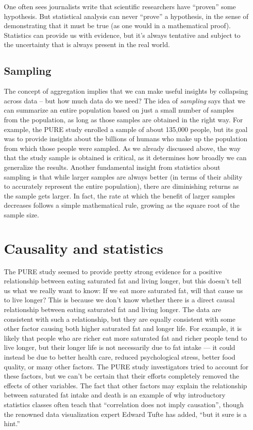 \documentclass[]{book}
\theoremstyle{definition}
\theoremstyle{definition}
\theoremstyle{definition}
\theoremstyle{remark}
\begin{document}
One often sees journalists write that scientific researchers have
``proven'' some hypothesis. But statistical analysis can never ``prove''
a hypothesis, in the sense of demonstrating that it must be true (as one
would in a mathematical proof). Statistics can provide us with evidence,
but it's always tentative and subject to the uncertainty that is always
present in the real world.

\subsection{Sampling}\label{sampling}

The concept of aggregation implies that we can make useful insights by
collapsing across data -- but how much data do we need? The idea of
\emph{sampling} says that we can summarize an entire population based on
just a small number of samples from the population, as long as those
samples are obtained in the right way. For example, the PURE study
enrolled a sample of about 135,000 people, but its goal was to provide
insights about the billions of humans who make up the population from
which those people were sampled. As we already discussed above, the way
that the study sample is obtained is critical, as it determines how
broadly we can generalize the results. Another fundamental insight from
statistics about sampling is that while larger samples are always better
(in terms of their ability to accurately represent the entire
population), there are diminishing returns as the sample gets larger. In
fact, the rate at which the benefit of larger samples decreases follows
a simple mathematical rule, growing as the square root of the sample
size.

\section{Causality and statistics}\label{causality-and-statistics}

The PURE study seemed to provide pretty strong evidence for a positive
relationship between eating saturated fat and living longer, but this
doesn't tell us what we really want to know: If we eat more saturated
fat, will that cause us to live longer? This is because we don't know
whether there is a direct causal relationship between eating saturated
fat and living longer. The data are consistent with such a relationship,
but they are equally consistent with some other factor causing both
higher saturated fat and longer life. For example, it is likely that
people who are richer eat more saturated fat and richer people tend to
live longer, but their longer life is not necessarily due to fat intake
--- it could instead be due to better health care, reduced psychological
stress, better food quality, or many other factors. The PURE study
investigators tried to account for these factors, but we can't be
certain that their efforts completely removed the effects of other
variables. The fact that other factors may explain the relationship
between saturated fat intake and death is an example of why introductory
statistics classes often teach that ``correlation does not imply
causation'', though the renowned data visualization expert Edward Tufte
has added, ``but it sure is a hint.''
\end{document}
